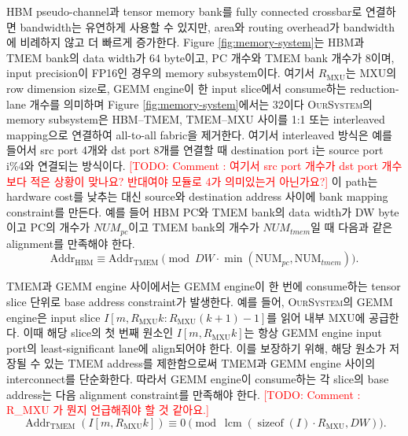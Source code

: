 \documentclass[11pt]{article}
\newcommand{\todo}[1]{\textcolor{red}{[TODO: #1]}}
\newcommand{\ours}{\textsc{OurSystem}}
\begin{document}
HBM pseudo-channel과 tensor memory bank를 fully connected crossbar로 연결하면 bandwidth는 유연하게 사용할 수 있지만, area와 routing overhead가 bandwidth에 비례하지 않고 더 빠르게 증가한다.
Figure \ref{fig:memory-system}는 HBM과 TMEM bank의 data width가 64 byte이고, PC 개수와 TMEM bank 개수가 8이며, input precision이 FP16인 경우의 memory subsystem이다.
여기서 $R_{\mathrm{MXU}}$는 MXU의 row dimension size로, GEMM engine이 한 input slice에서 consume하는 reduction-lane 개수를 의미하며 Figure \ref{fig:memory-system}에서는 32이다
\ours{}의 memory subsystem은 HBM--TMEM, TMEM--MXU 사이를 1:1 또는 interleaved mapping으로 연결하여 all-to-all fabric을 제거한다. 여기서 interleaved 방식은 예를 들어서 src port 4개와 dst port 8개를 연결할 때 destination port i는 source port i\%4와 연결되는 방식이다. \todo{Comment : 여기서 src port 개수가 dst port 개수보다 적은 상황이 맞나요? 반대여야 모듈로 4가 의미있는거 아닌가요?}
이 path는 hardware cost를 낮추는 대신 source와 destination address 사이에 bank mapping constraint를 만든다.
예를 들어 HBM PC와 TMEM bank의 data width가 DW byte이고 PC의 개수가 $NUM_{pc}$이고 TMEM bank의 개수가 $NUM_{tmem}$일 때 다음과 같은 alignment를 만족해야 한다.
\begin{equation}
    \mathrm{Addr}_{\mathrm{HBM}}
    \equiv
    \mathrm{Addr}_{\mathrm{TMEM}}
    \pmod{DW \cdot \min\left(\mathrm{NUM}_{pc}, \mathrm{NUM}_{tmem}\right)} .
    \label{eq:hbm_tmem_addr_constr}
\end{equation}

TMEM과 GEMM engine 사이에서는 GEMM engine이 한 번에 consume하는 tensor slice 단위로 base address constraint가 발생한다.
예를 들어, \ours{}의 GEMM engine은 input slice
$I[m, R_{\mathrm{MXU}} k : R_{\mathrm{MXU}}(k+1)-1]$를 읽어 내부 MXU에 공급한다.
이때 해당 slice의 첫 번째 원소인 $I[m, R_{\mathrm{MXU}} k]$는 항상 GEMM engine input port의 least-significant lane에 align되어야 한다.
이를 보장하기 위해, 해당 원소가 저장될 수 있는 TMEM address를 제한함으로써 TMEM과 GEMM engine 사이의 interconnect를 단순화한다.
따라서 GEMM engine이 consume하는 각 slice의 base address는 다음 alignment constraint를 만족해야 한다. \todo{Comment : R\_MXU 가 뭔지 언급해줘야 할 것 같아요.}
\begin{equation}
    \operatorname{Addr}_{\mathrm{TMEM}}
    \left(I\left[m, R_{\mathrm{MXU}} k\right]\right)
    \equiv
    0
    \pmod{
        \operatorname{lcm}
        \left(
            \operatorname{sizeof}(I) \cdot R_{\mathrm{MXU}},
            DW
        \right)
    } .
\end{equation}
\end{document}
